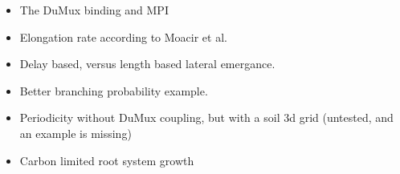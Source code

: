 \begin{itemize}

\item The DuMux binding and MPI

\item Elongation rate according to Moacir et al.

\item Delay based, versus length based lateral emergance.

\item Better branching probability example.

\item Periodicity without DuMux coupling, but with a soil 3d grid (untested, and an example is missing)

\item Carbon limited root system growth

\end{itemize}

